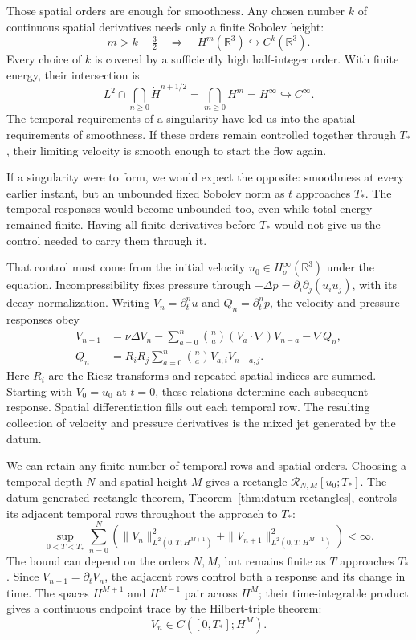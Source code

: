 Those spatial orders are enough for smoothness. Any chosen number \(k\)
of continuous spatial derivatives needs only a finite Sobolev height:
\[
 m>k+\tfrac32
 \quad\Longrightarrow\quad H^m(\mathbb R^3)\hookrightarrow C^k(\mathbb R^3).
\]
Every choice of \(k\) is covered by a sufficiently high half-integer order.
With finite energy, their intersection is
\[
 L^2\cap\bigcap_{n\ge0}\dot H^{n+1/2}
 =\bigcap_{m\ge0}H^m
 =H^\infty\hookrightarrow C^\infty.
\]
The temporal requirements of a singularity have led us into the spatial
requirements of smoothness. If these orders remain controlled together
through \(T_*\), their limiting velocity is smooth enough to start the
flow again.

If a singularity were to form, we would expect the opposite: smoothness at
every earlier instant, but an unbounded fixed Sobolev norm as \(t\) approaches
\(T_*\). The temporal responses would become unbounded too, even while total
energy remained finite. Having all finite derivatives before \(T_*\) would
not give us the control needed to carry them through it.

That control must come from the initial velocity
\(u_0\in H^\infty_\sigma(\mathbb R^3)\) under the equation.
Incompressibility fixes pressure through
\(-\Delta p=\partial_i\partial_j(u_i u_j)\), with its decay normalization.
Writing \(V_n=\partial_t^nu\) and \(Q_n=\partial_t^np\), the velocity
and pressure responses obey
\[
 \begin{aligned}
 V_{n+1}&=\nu\Delta V_n
 -\sum_{a=0}^n\binom na(V_a\cdot\nabla)V_{n-a}-\nabla Q_n,\\
 Q_n&=R_iR_j\sum_{a=0}^n\binom na V_{a,i}V_{n-a,j}.
 \end{aligned}
\]
Here \(R_i\) are the Riesz transforms and repeated spatial indices are
summed. Starting with \(V_0=u_0\) at \(t=0\), these relations determine
each subsequent response. Spatial differentiation fills out each temporal
row. The resulting collection of velocity and pressure derivatives is the
mixed jet generated by the datum.

We can retain any finite number of temporal rows and spatial orders.
Choosing a temporal depth \(N\) and spatial height \(M\) gives a rectangle
\(\mathcal R_{N,M}[u_0;T_*]\). The datum-generated rectangle theorem,
Theorem~\ref{thm:datum-rectangles}, controls its adjacent temporal rows
throughout the approach to \(T_*\):
\[
 \sup_{0<T<T_*}\sum_{n=0}^{N}\left(
 \|V_n\|_{L^2(0,T;H^{M+1})}^2
 +\|V_{n+1}\|_{L^2(0,T;H^{M-1})}^2
 \right)<\infty.
\]
The bound can depend on the orders \(N,M\), but remains finite as
\(T\) approaches \(T_*\). Since \(V_{n+1}=\partial_tV_n\), the
adjacent rows control both a response and its change in time. The spaces
\(H^{M+1}\) and \(H^{M-1}\) pair across \(H^M\); their time-integrable
product gives a continuous endpoint trace by the Hilbert-triple theorem:
\[
 V_n\in C([0,T_*];H^M).
\]

